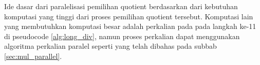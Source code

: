       Ide dasar dari paralelisasi pemilihan quotient berdasarkan dari kebutuhan komputasi yang tinggi dari proses pemilihan quotient tersebut. Komputasi lain yang membutuhkan komputasi besar adalah perkalian pada pada langkah ke-11 di pseudocode \ref{alg:long_div}, namun proses perkalian dapat menggunakan algoritma perkalian paralel seperti yang telah dibahas pada subbab \ref{sec:mul_parallel}.

